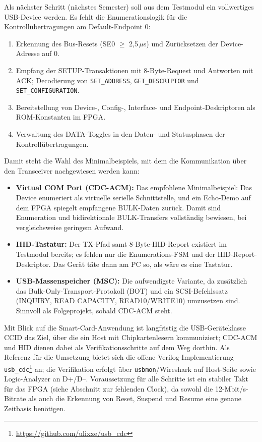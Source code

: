 \documentclass[a4paper,11pt]{article}
\begin{document}
Als nächster Schritt (nächstes Semester) soll aus dem Testmodul ein vollwertiges USB-Device werden. Es fehlt die Enumerationslogik für die Kontrollübertragungen am Default-Endpoint 0:
\begin{enumerate}
	\item Erkennung des Bus-Resets (SE0 $\geq$ 2,5\,$\mu$s) und Zurücksetzen der Device-Adresse auf 0.
	\item Empfang der SETUP-Transaktionen mit 8-Byte-Request und Antworten mit ACK; Decodierung von \texttt{SET\_ADDRESS}, \texttt{GET\_DESCRIPTOR} und \texttt{SET\_CONFIGURATION}.
	\item Bereitstellung von Device-, Config-, Interface- und Endpoint-Deskriptoren als ROM-Konstanten im FPGA.
	\item Verwaltung des DATA-Toggles in den Daten- und Statusphasen der Kontrollübertragungen.
\end{enumerate}
Damit steht die Wahl des Minimalbeispiels, mit dem die Kommunikation über den Transceiver nachgewiesen werden kann:
\begin{itemize}
	\item \textbf{Virtual COM Port (CDC-ACM):} Das empfohlene Minimalbeispiel: Das Device enumeriert als virtuelle serielle Schnittstelle, und ein Echo-Demo auf dem FPGA spiegelt empfangene BULK-Daten zurück. Damit sind Enumeration und bidirektionale BULK-Transfers vollständig bewiesen, bei vergleichsweise geringem Aufwand.
	\item \textbf{HID-Tastatur:} Der TX-Pfad samt 8-Byte-HID-Report existiert im Testmodul bereits; es fehlen nur die Enumerations-FSM und der HID-Report-Deskriptor. Das Gerät täte dann am PC so, als wäre es eine Tastatur.
	\item \textbf{USB-Massenspeicher (MSC):} Die aufwendigste Variante, da zusätzlich das Bulk-Only-Transport-Protokoll (BOT) und ein SCSI-Befehlssatz (INQUIRY, READ CAPACITY, READ10/WRITE10) umzusetzen sind. Sinnvoll als Folgeprojekt, sobald CDC-ACM steht.
\end{itemize}
Mit Blick auf die Smart-Card-Anwendung ist langfristig die USB-Geräteklasse CCID das Ziel, über die ein Host mit Chipkartenlesern kommuniziert; CDC-ACM und HID dienen dabei als Verifikationsschritte auf dem Weg dorthin.
Als Referenz für die Umsetzung bietet sich die offene Verilog-Implementierung \texttt{usb\_cdc}\footnote{\url{https://github.com/ulixxe/usb_cdc}} an; die Verifikation erfolgt über \texttt{usbmon}/Wireshark auf Host-Seite sowie Logic-Analyzer an D+/D--. Voraussetzung für alle Schritte ist ein stabiler Takt für das FPGA (siehe Abschnitt zur fehlenden Clock), da sowohl die 12-Mbit/s-Bitrate als auch die Erkennung von Reset, Suspend und Resume eine genaue Zeitbasis benötigen.
\end{document}

